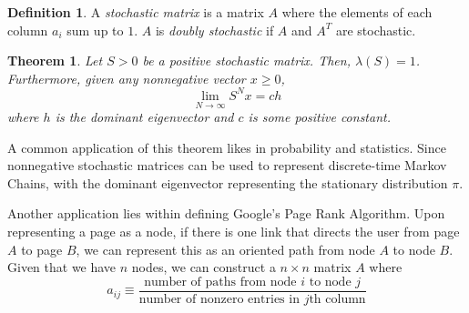 \documentclass{article}
\newtheorem{theorem}{Theorem}[section]
\theoremstyle{remark}
\theoremstyle{definition}
\newtheorem{definition}{Definition}[section]
\begin{document}
\begin{definition}
A \textit{stochastic matrix} is a matrix $A$ where the elements of each column $a_i$ sum up to $1$. $A$ is \textit{doubly stochastic} if $A$ and $A^T$ are stochastic. 
\end{definition}

\begin{theorem}
Let $S > 0$ be a positive stochastic matrix. Then, $\lambda(S) = 1$. Furthermore, given any nonnegative vector $x \geq 0$, 
\[\lim_{N \rightarrow \infty} S^N x = c h\]
where $h$ is the dominant eigenvector and $c$ is some positive constant. 
\end{theorem}

A common application of this theorem likes in probability and statistics. Since nonnegative stochastic matrices can be used to represent discrete-time Markov Chains, with the dominant eigenvector representing the stationary distribution $\pi$. 

Another application lies within defining Google's Page Rank Algorithm. Upon representing a page as a node, if there is one link that directs the user from page $A$ to page $B$, we can represent this as an oriented path from node $A$ to node $B$. Given that we have $n$ nodes, we can construct a $n \times n$ matrix $A$ where 
\[a_{i j} \equiv  \frac{\text{number of paths from node $i$ to node $j$}}{\text{number of nonzero entries in $j$th column}}\]
\end{document}
